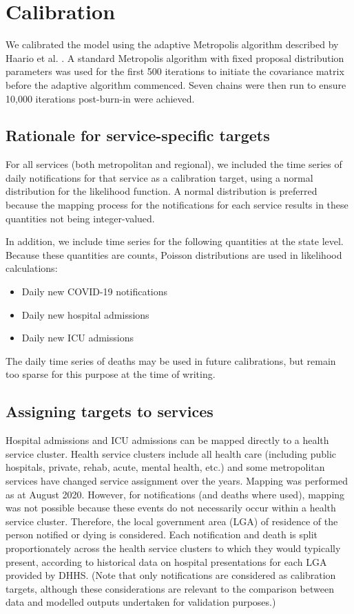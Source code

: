 \section{Calibration}

We calibrated the model using the adaptive Metropolis algorithm described by Haario et al. \cite{RN4}. A standard Metropolis algorithm with fixed proposal distribution parameters was used for the first 500 iterations to initiate the covariance matrix before the adaptive algorithm commenced. Seven chains were then run to ensure 10,000 iterations post-burn-in were achieved.

\subsection{Rationale for service-specific targets}
For all services (both metropolitan and regional), we included the time series of daily notifications for that service as a calibration target, using a normal distribution for the likelihood function. A normal distribution is preferred because the mapping process for the notifications for each service results in these quantities not being integer-valued.

In addition, we include time series for the following quantities at the state level. Because these quantities are counts, Poisson distributions are used in likelihood calculations:
\begin{itemize}
    \item Daily new COVID-19 notifications
    \item Daily new hospital admissions
    \item Daily new ICU admissions
\end{itemize}

The daily time series of deaths may be used in future calibrations, but remain too sparse for this purpose at the time of writing.

\subsection{Assigning targets to services}
Hospital admissions and ICU admissions can be mapped directly to a health service cluster. Health service clusters include all health care (including public hospitals, private, rehab, acute, mental health, etc.) and some metropolitan services have changed service assignment over the years. Mapping was performed as at August 2020. However, for notifications (and deaths where used), mapping was not possible because these events do not necessarily occur within a health service cluster. Therefore, the local government area (LGA) of residence of the person notified or dying is considered. Each notification and death is split proportionately across the health service clusters to which they would typically present, according to historical data on hospital presentations for each LGA provided by DHHS. (Note that only notifications are considered as calibration targets, although these considerations are relevant to the comparison between data and modelled outputs undertaken for validation purposes.)

